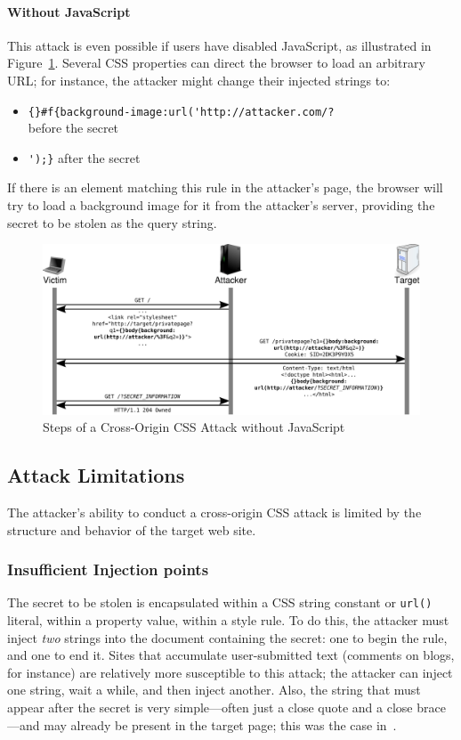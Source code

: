 \documentclass{acm_proc_article-sp}
\begin{document}
\paragraph{Without JavaScript}
This attack is even possible if users have disabled JavaScript,
as illustrated in Figure~\ref{figure:steps}.  Several CSS
properties can direct the browser to load an arbitrary URL; for
instance, the attacker might change their injected strings to:

\begin{itemize}
\item \verb|{}#f{background-image:url('http://attacker.com/?|\\
  before the secret
\item \verb|');}| after the secret
\end{itemize}

If there is an element matching this rule in the attacker's page, the
browser will try to load a background image for it from the attacker's
server, providing the secret to be stolen as the query string.

\begin{figure}
\centering
\includegraphics[width=\linewidth]{steps}
\caption{Steps of a Cross-Origin CSS Attack without JavaScript}
\label{figure:steps}
\end{figure}

\subsection{Attack Limitations} \label{sec:limits}
The attacker's ability to conduct a cross-origin CSS attack is limited
by the structure and behavior of the target web site.

\subsubsection{Insufficient Injection points}
The secret to be stolen is encapsulated within a CSS string constant
or \verb|url()| literal, within a property value, within a style rule.
To do this, the attacker must inject \emph{two} strings into the
document containing the secret: one to begin the rule, and one to end
it. Sites that accumulate user-submitted text (comments on blogs, for
instance) are relatively more susceptible to this attack; the attacker
can inject one string, wait a while, and then inject another.  Also,
the string that must appear after the secret is very simple---often
just a close quote and a close brace---and may already be present in
the target page; this was the case in~\cite{cssxss08}.
\end{document}
